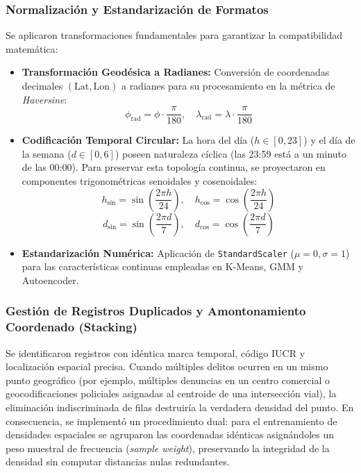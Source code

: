 \subsubsection{Normalización y Estandarización de Formatos}

Se aplicaron transformaciones fundamentales para garantizar la compatibilidad matemática:
\begin{itemize}
    \item \textbf{Transformación Geodésica a Radianes:} Conversión de coordenadas decimales $(\text{Lat}, \text{Lon})$ a radianes para su procesamiento en la métrica de \textit{Haversine}:
    \begin{equation}
        \phi_{\text{rad}} = \phi \cdot \frac{\pi}{180}, \quad \lambda_{\text{rad}} = \lambda \cdot \frac{\pi}{180}
    \end{equation}
    \item \textbf{Codificación Temporal Circular:} La hora del día ($h \in [0, 23]$) y el día de la semana ($d \in [0, 6]$) poseen naturaleza cíclica (las 23:59 está a un minuto de las 00:00). Para preservar esta topología continua, se proyectaron en componentes trigonométricas senoidales y cosenoidales:
    \begin{equation}
        h_{\sin} = \sin\left(\frac{2\pi h}{24}\right), \quad h_{\cos} = \cos\left(\frac{2\pi h}{24}\right)
    \end{equation}
    \begin{equation}
        d_{\sin} = \sin\left(\frac{2\pi d}{7}\right), \quad d_{\cos} = \cos\left(\frac{2\pi d}{7}\right)
    \end{equation}
    \item \textbf{Estandarización Numérica:} Aplicación de \texttt{StandardScaler} ($\mu = 0, \sigma = 1$) para las características continuas empleadas en K-Means, GMM y Autoencoder.
\end{itemize}

\subsubsection{Gestión de Registros Duplicados y Amontonamiento Coordenado (Stacking)}

Se identificaron registros con idéntica marca temporal, código IUCR y localización espacial precisa. Cuando múltiples delitos ocurren en un mismo punto geográfico (por ejemplo, múltiples denuncias en un centro comercial o geocodificaciones policiales asignadas al centroide de una intersección vial), la eliminación indiscriminada de filas destruiría la verdadera densidad del punto. En consecuencia, se implementó un procedimiento dual: para el entrenamiento de densidades espaciales se agruparon las coordenadas idénticas asignándoles un peso muestral de frecuencia (\textit{sample weight}), preservando la integridad de la densidad sin computar distancias nulas redundantes.

